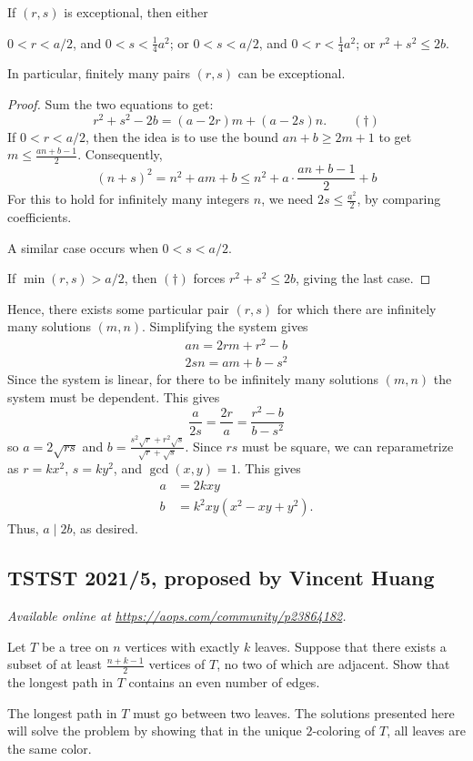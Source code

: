 \documentclass[11pt]{scrartcl}
\begin{document}
\begin{claim*}
  If $(r,s)$ is exceptional, then either
  \begin{itemize}
    \ii $0 < r < a/2$, and $0 < s < \frac14 a^2$; or
    \ii $0 < s < a/2$, and $0 < r < \frac14 a^2$; or
    \ii $r^2 + s^2 \le 2b$.
  \end{itemize}
  In particular, finitely many pairs $(r,s)$ can be exceptional.
\end{claim*}

\begin{proof}
  Sum the two equations to get:
  \[ r^2+s^2-2b = (a-2r)m + (a-2s)n. \qquad (\dagger) \]
  If $0 < r < a/2$, then the idea is to use the bound
  $an+b \ge 2m+1$ to get $m \le \frac{an+b-1}{2}$.
  Consequently,
  \[ (n+s)^2 = n^2+am+b \le n^2 + a \cdot \frac{an+b-1}{2} + b \]
  For this to hold for infinitely many integers $n$,
  we need $2s \le \frac{a^2}{2}$, by comparing coefficients.

  A similar case occurs when $0 < s < a/2$.

  If $\min(r,s) > a/2$, then $(\dagger)$ forces $r^2+s^2 \le 2b$,
  giving the last case.
\end{proof}

Hence, there exists some particular pair $(r,s)$
for which there are infinitely many solutions
$(m,n)$. Simplifying the system gives
\begin{gather*}
  an = 2rm + r^2-b \\
  2sn = am + b-s^2
\end{gather*}
Since the system is linear,
for there to be infinitely many solutions $(m, n)$
the system must be dependent.
This gives \[\frac{a}{2s}=\frac{2r}{a}=\frac{r^2-b}{b-s^2}\]
so $a = 2\sqrt{rs}$ and $b = \frac{s^2\sqrt{r}+r^2\sqrt{s}}{\sqrt{r}+\sqrt{s}}$.
Since $rs$ must be square, we can reparametrize as $r=kx^2$, $s=ky^2$, and $\gcd(x, y)=1$.
This gives
\begin{align*}
    a &= 2kxy \\
    b &= k^2xy(x^2-xy+y^2).
\end{align*}
Thus, $a \mid 2b$, as desired.
\pagebreak

\subsection{TSTST 2021/5, proposed by Vincent Huang}
\textsl{Available online at \url{https://aops.com/community/p23864182}.}
\begin{mdframed}[style=mdpurplebox,frametitle={Problem statement}]
Let $T$ be a tree on $n$ vertices with exactly $k$ leaves.
Suppose that there exists a subset of
at least $\frac{n+k-1}{2}$ vertices of $T$,
no two of which are adjacent.
Show that the longest path in $T$ contains
an even number of edges.
\end{mdframed}
The longest path in $T$ must go between two leaves. The solutions presented here
will solve the problem by showing that in the unique $2$-coloring of $T$, all
leaves are the same color.
\end{document}
